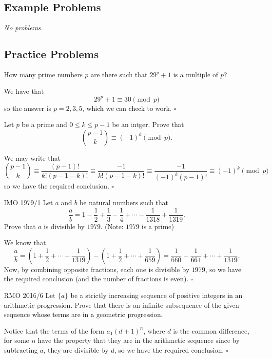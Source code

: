 \documentclass{article}
\newcommand{\noproblems}{\emph{No problems.}}
\begin{document}
\subsection{Example Problems}

\noproblems

\subsection{Practice Problems}

\begin{problem}[2.14.1]{}
How many prime numbers $p$ are there such that $29^p + 1$ is a multiple of $p$?
\end{problem}
We have that \[29^p + 1\equiv 30 \pmod{p}\] so the answer is $p = \boxed{2, 3, 5}$, which we can check to work. $\square$

\begin{problem}[2.14.2]{}
Let $p$ be a prime and $0 \le k \le p-1$ be an intger. Prove that \[\binom{p - 1}{k} \equiv (-1)^k \pmod{p}.\]
\end{problem}
We may write that \[\binom{p-1}{k} \equiv \dfrac{(p-1)!}{k!(p-1-k)!} \equiv \dfrac{-1}{k!(p-1-k)!} \equiv \dfrac{-1}{(-1)^k(p-1)!} \equiv (-1)^k \pmod{p}\] so we have the required conclusion. $\square$

\begin{problem}[2.14.3]{IMO 1979/1}
Let $a$ and $b$ be natural numbers such that \[\dfrac{a}{b} = 1 - \dfrac{1}{2} + \dfrac{1}{3} - \dfrac{1}{4} + \cdots - \dfrac{1}{1318} + \dfrac{1}{1319}.\] Prove that $a$ is divisible by $1979$. (Note: $1979$ is a prime)
\end{problem}
We know that \[\dfrac{a}{b} = \left(1+\dfrac{1}{2}+\cdots+\dfrac{1}{1319}\right) - \left(1+\dfrac{1}{2}+\cdots+\dfrac{1}{659}\right) = \dfrac{1}{660} + \dfrac{1}{661} + \cdots + \dfrac{1}{1319}.\] Now, by combining opposite fractions, each one is divisible by $1979$, so we have the required conclusion (and the number of fractions is even). $\square$

\begin{problem}[2.14.4]{RMO 2016/6}
Let $\{a\}$ be a strictly increasing sequence of positive integers in an arithmetic progression. Prove that there is an infinite subsequence of the given sequence whose terms are in a geometric progression.
\end{problem}
Notice that the terms of the form $a_1(d+1)^n$, where $d$ is the common difference, for some $n$ have the property that they are in the arithmetic sequence since by subtracting $a$, they are divisible by $d$, so we have the required conclusion. $\square$
\end{document}
